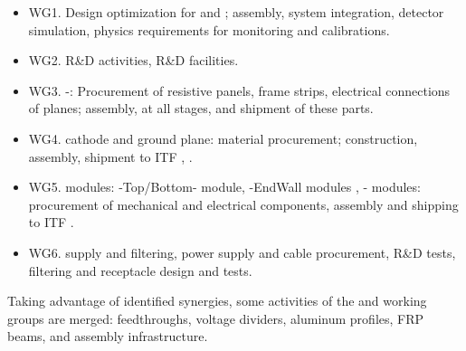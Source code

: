 \begin{itemize}
\item WG1. Design optimization for  and ; assembly, system integration, detector simulation, physics requirements for monitoring and calibrations. %
\item WG2. R\&D activities, R\&D facilities. %
\item WG3. -: Procurement of resistive panels, frame strips, electrical connections of planes; assembly,  at all stages, and shipment of these parts. %
\item WG4.  cathode and ground plane:  material procurement; construction, assembly, shipment to ITF , .%
\item WG5.  modules: -Top/Bottom- module, -EndWall modules , - modules: procurement of mechanical and electrical components, assembly and shipping to ITF . %
\item WG6.  supply and filtering,  power supply and cable procurement, R\&D tests, filtering and receptacle design and tests. %
\end{itemize}

Taking advantage of identified synergies, some activities of the  and  working groups are merged: feedthroughs, voltage dividers, aluminum profiles, FRP beams, and assembly infrastructure.

